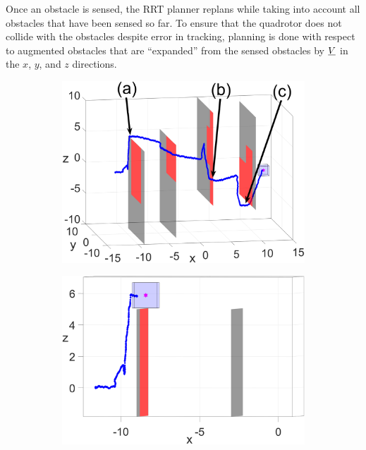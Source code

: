 Once an obstacle is sensed, the RRT planner replans while taking into account all obstacles that have been sensed so far. To ensure that the quadrotor does not collide with the obstacles despite error in tracking, planning is done with respect to augmented obstacles that are ``expanded'' from the sensed obstacles by $\underline{V}$ in the $x$, $y$, and $z$ directions.

\begin{figure}
	\centering
	\begin{subfigure}[t]{0.49\columnwidth} \label{subfig:sim_4}
		\includegraphics[width=\columnwidth]{fig/1173}
	\end{subfigure}  
	\begin{subfigure}[t]{0.49\columnwidth} \label{subfig:sim_1}
		\includegraphics[width=\columnwidth]{fig/224}
		\caption{}
	\end{subfigure}
	

\end{figure}
